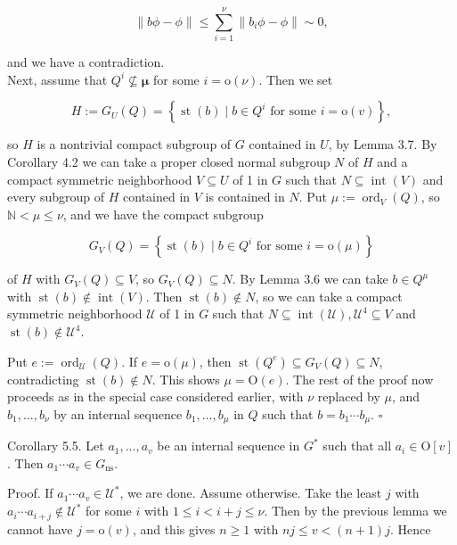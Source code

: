 \documentclass[10pt]{article}
\begin{document}
$$
\|b \phi-\phi\| \leq \sum_{i=1}^{\nu}\left\|b_{i} \phi-\phi\right\| \sim 0,
$$

and we have a contradiction.\\
Next, assume that $Q^{i} \nsubseteq \boldsymbol{\mu}$ for some $i=\mathrm{o}(\nu)$. Then we set

$$
H:=G_{U}(Q)=\left\{\operatorname{st}(b) \mid b \in Q^{i} \text { for some } i=\mathrm{o}(v)\right\},
$$

so $H$ is a nontrivial compact subgroup of $G$ contained in $U$, by Lemma 3.7. By Corollary 4.2 we can take a proper closed normal subgroup $N$ of $H$ and a compact symmetric neighborhood $V \subseteq U$ of 1 in $G$ such that $N \subseteq \operatorname{int}(V)$ and every subgroup of $H$ contained in $V$ is contained in $N$. Put $\mu:=\operatorname{ord}_{V}(Q)$, so $\mathbb{N}<\mu \leq \nu$, and we have the compact subgroup

$$
G_{V}(Q)=\left\{\operatorname{st}(b) \mid b \in Q^{i} \text { for some } i=\mathrm{o}(\mu)\right\}
$$

of $H$ with $G_{V}(Q) \subseteq V$, so $G_{V}(Q) \subseteq N$. By Lemma 3.6 we can take $b \in Q^{\mu}$ with $\operatorname{st}(b) \notin \operatorname{int}(V)$. Then $\operatorname{st}(b) \notin N$, so we can take a compact symmetric neighborhood $\mathcal{U}$ of 1 in $G$ such that $N \subseteq \operatorname{int}(\mathcal{U}), \mathcal{U}^{4} \subseteq V$ and $\operatorname{st}(b) \notin \mathcal{U}^{4}$.

Put $e:=\operatorname{ord}_{\mathcal{U}}(Q)$. If $e=\mathrm{o}(\mu)$, then $\operatorname{st}\left(Q^{e}\right) \subseteq G_{V}(Q) \subseteq N$, contradicting $\operatorname{st}(b) \notin N$. This shows $\mu=\mathrm{O}(e)$. The rest of the proof now proceeds as in the special case considered earlier, with $\nu$ replaced by $\mu$, and $b_{1}, \ldots, b_{\nu}$ by an internal sequence $b_{1}, \ldots, b_{\mu}$ in $Q$ such that $b=b_{1} \cdots b_{\mu}$. \(\square\)

Corollary 5.5. Let $a_{1}, \ldots, a_{v}$ be an internal sequence in $G^{*}$ such that all $a_{i} \in \mathrm{O}[v]$. Then $a_{1} \cdots a_{v} \in G_{\mathrm{ns}}$.

Proof. If $a_{1} \cdots a_{v} \in \mathcal{U}^{*}$, we are done. Assume otherwise. Take the least $j$ with $a_{i} \cdots a_{i+j} \notin \mathcal{U}^{*}$ for some $i$ with $1 \leq i<i+j \leq \nu$. Then by the previous lemma we cannot have $j=\mathrm{o}(v)$, and this gives $n \geq 1$ with $n j \leq v<(n+1) j$. Hence
\end{document}
